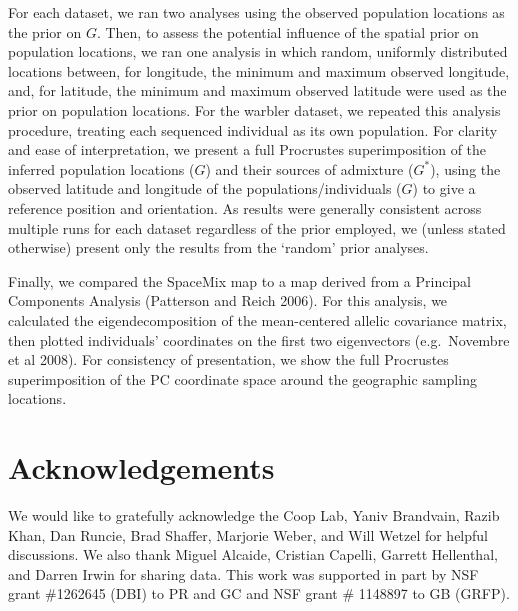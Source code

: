 \documentclass[12pt]{article}
\newcommand{\identifyadmixsource}[1]{{#1^{*}}}
\begin{document}
For each dataset, we ran two analyses using the observed population locations as the prior on $G$.  
Then, to assess the potential influence of the spatial prior on population locations, 
we ran one analysis in which random, uniformly distributed locations between, 
for longitude, the minimum and maximum observed longitude, 
and, for latitude, the minimum and maximum observed latitude were used as the prior on population locations.  
For the warbler dataset, we repeated this analysis procedure, treating each sequenced individual as its own population.  
For clarity and ease of interpretation, we present a full Procrustes superimposition of the inferred population locations ($G$) 
and their sources of admixture ($\identifyadmixsource{G}$), 
using the observed latitude and longitude of the populations/individuals ($G$) to give a reference position and orientation.  
As results were generally consistent across multiple runs for each dataset regardless of the prior employed, 
we (unless stated otherwise) present only the results from the `random' prior analyses.

Finally, we compared the SpaceMix map to a map derived from a Principal Components Analysis (Patterson and Reich 2006).  For this analysis, we calculated the eigendecomposition of the mean-centered allelic covariance matrix, then plotted individuals' coordinates on the first two eigenvectors (e.g.\ Novembre et al 2008).  For consistency of presentation, we show the full Procrustes superimposition of the PC coordinate space around the geographic sampling locations.



\section*{Acknowledgements}
We would like to gratefully acknowledge the Coop Lab, Yaniv Brandvain, Razib Khan, Dan Runcie, Brad Shaffer, Marjorie Weber, and Will Wetzel for helpful discussions.  We also thank Miguel Alcaide, Cristian Capelli, Garrett Hellenthal, and Darren Irwin  for sharing data.
This work was supported in part by NSF grant \#1262645 (DBI) to PR and GC and NSF grant \# 1148897 to GB (GRFP).


\newpage



\newpage


\end{document}
